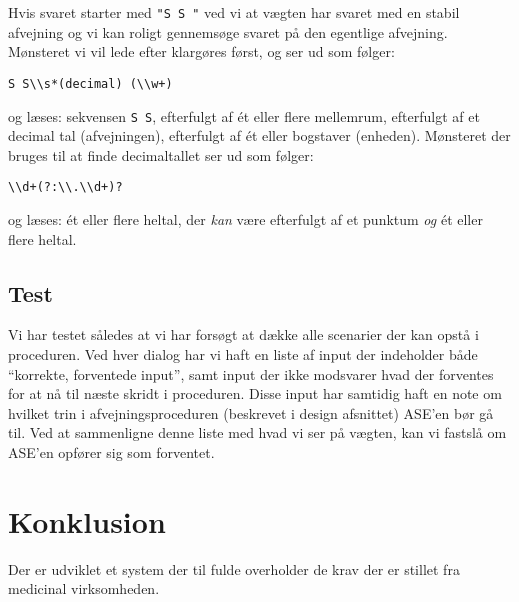 \documentclass[a4paper]{article}
\begin{document}
Hvis svaret starter med \texttt{"S S "} ved vi at vægten har svaret med en stabil afvejning og vi kan roligt gennemsøge svaret på den egentlige afvejning. Mønsteret vi vil lede efter klargøres først, og ser ud som følger:

\begin{verbatim}
S S\\s*(decimal) (\\w+)
\end{verbatim}

og læses: sekvensen \texttt{S S}, efterfulgt af ét eller flere mellemrum, efterfulgt af et decimal tal (afvejningen), efterfulgt af ét eller bogstaver (enheden). Mønsteret der bruges til at finde decimaltallet ser ud som følger:
\begin{verbatim}
\\d+(?:\\.\\d+)? 
\end{verbatim}
og læses: ét eller flere heltal, der \emph{kan} være efterfulgt af et punktum \emph{og} ét eller flere heltal.



\subsection{Test} %

Vi har testet således at vi har forsøgt at dække alle scenarier der kan opstå i proceduren. Ved hver dialog har vi haft en liste af input der indeholder både ``korrekte, forventede input'', samt input der ikke modsvarer hvad der forventes for at nå til næste skridt i proceduren. Disse input har samtidig haft en note om hvilket trin i afvejningsproceduren (beskrevet i design afsnittet) ASE'en bør gå til. Ved at sammenligne denne liste med hvad vi ser på vægten, kan vi fastslå om ASE'en opfører sig som forventet. 


\clearpage




\section{Konklusion} %

Der er udviklet et system der til fulde overholder de krav der er stillet fra medicinal virksomheden.
\end{document}
